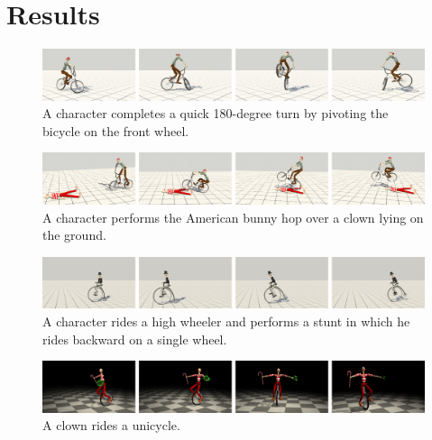 \section{Results}
\label{sec:results}

\begin{figure}[ht]
\centering
\includegraphics[width=\textwidth]{figures/frontWheelPivot}
\caption{A character completes a quick 180-degree turn by pivoting the bicycle on the front wheel.}
\label{fig:pivot}
\end{figure}


\begin{figure}[ht]
\centering
\includegraphics[width=\textwidth]{figures/bunnyHop}
\caption{A character performs the American bunny hop over a clown lying on the ground.}
\vspace{-0.1in}
\label{fig:bunnyhop}
\end{figure}

\begin{figure}[ht]
\centering
\includegraphics[width=\textwidth]{figures/velocipede}
\caption{A character rides a high wheeler and performs a stunt in which he rides backward on a single wheel.}
\label{fig:highwheeler}
\end{figure}

\begin{figure}[ht]
\centering
\includegraphics[width=\textwidth]{figures/unicycle}
\caption{A clown rides a unicycle.}
\vspace{-0.1in}
\label{fig:unicycle}
\end{figure}

